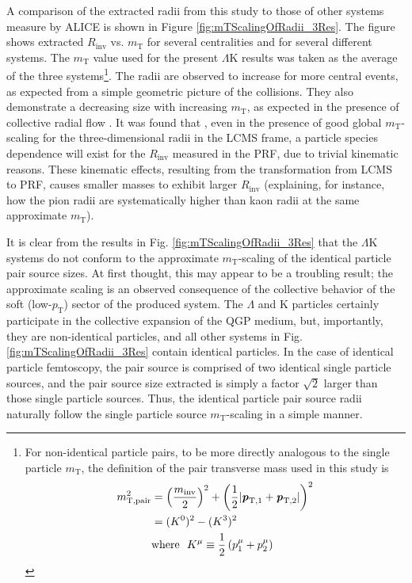 \documentclass[ALICE,manyauthors]{cernphprep}
\newcommand{\mt}{$m_{\mathrm{T}}$\xspace}
\newcommand{\pt}{$p_{\mathrm{T}}$\xspace}
\newcommand{\Lam}{$\Lambda$\xspace}
\newcommand{\LamK}{$\Lambda$K\xspace}
\begin{document}
A comparison of the extracted radii from this study to those of other systems measure by ALICE \cite{Adam:2015vja} is shown in Figure \ref{fig:mTScalingOfRadii_3Res}. 
The figure shows extracted $R_{\mathrm{inv}}$ vs. \mt for several centralities and for several different systems.
The \mt value used for the present \LamK results was taken as the average of the three systems\footnote[1]
{
For non-identical particle pairs, to be more directly analogous to the single particle \mt, the definition of the pair transverse mass used in this study is
\begin{equation*}
\begin{aligned}
 m_{\mathrm{T, pair}}^{2} &= \left( \frac{m_{\mathrm{inv}}}{2} \right)^{2} + \left( \frac{1}{2} |\textbf{\textit{p}}_{\mathrm{T,1}} + \textbf{\textit{p}}_{\mathrm{T,2}}| \right)^{2} \\
 &= (K^{0})^{2} - (K^{3})^{2} \\
 &\mathrm{where} ~~K^{\mu} \equiv \frac{1}{2} \left( p_{1}^{\mu} + p_{2}^{\mu} \right)
\end{aligned}
\label{eqn:PairmTv1}
\end{equation*}
}.
The radii are observed to increase for more central events, as expected from a simple geometric picture of the collisions.
They also demonstrate a decreasing size with increasing \mt, as expected in the presence of collective radial flow \cite{Akkelin:1995gh}.
It was found that \cite{Kisiel:2014upa}, even in the presence of good global \mt-scaling for the three-dimensional radii in the LCMS frame, a particle species dependence will exist for the $R_{\mathrm{inv}}$ measured in the PRF, due to trivial kinematic reasons.
These kinematic effects, resulting from the transformation from LCMS to PRF, causes smaller masses to exhibit larger $R_{\mathrm{inv}}$ \cite{Adam:2015vja} (explaining, for instance, how the pion radii are systematically higher than kaon radii at the same approximate \mt).


It is clear from the results in Fig. \ref{fig:mTScalingOfRadii_3Res} that the \LamK systems do not conform to the approximate \mt-scaling of the identical particle pair source sizes.
At first thought, this may appear to be a troubling result; the approximate scaling is an observed consequence of the collective behavior of the soft (low-\pt) sector of the produced system.
The \Lam and K particles certainly participate in the collective expansion of the QGP medium, but, importantly, they are non-identical particles, and all other systems in Fig. \ref{fig:mTScalingOfRadii_3Res} contain identical particles.
In the case of identical particle femtoscopy, the pair source is comprised of two identical single particle sources, and the pair source size extracted is simply a factor $\sqrt{2}$ larger than those single particle sources.
Thus, the identical particle pair source radii naturally follow the single particle source \mt-scaling in a simple manner.
\end{document}
